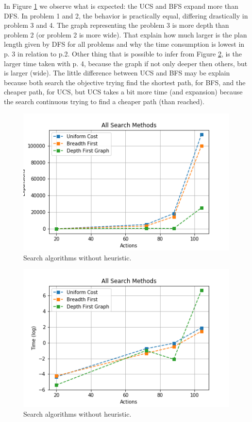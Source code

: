 \documentclass[a4paper]{article}
\begin{document}
In Figure \ref{figsm234} we observe what is expected: the UCS and BFS expand more than DFS. In problem 1 and 2, the behavior is practically equal, differing drastically in problem 3 and 4. The graph representing the problem 3 is more depth than problem 2 (or problem 2 is more wide). That explain how much larger is the plan length given by DFS for all problems and why the time consumption is lowest in p. 3 in relation to p.2. Other thing that is possible to infer from Figure \ref{figsm231}, is the larger time taken with p. 4, because the graph if not only deeper then others, but is larger (wide). The little difference between UCS and BFS may be explain because both search the objective trying find the shortest path, for BFS, and the cheaper path, for UCS, but UCS takes a bit more time (and expansion) because the search continuous trying to find a cheaper path (than reached).

\begin{figure}[htpb]
\begin{center}
\includegraphics[width=1\columnwidth]{fig/results_sm234.png}
\caption{Search algorithms without heuristic.}
\end{center}
\label{figsm234}
\end{figure}
    
\begin{figure}[htpb]
\begin{center}
\includegraphics[width=1\columnwidth]{fig/results_sm231.png}
\caption{Search algorithms without heuristic.}
\end{center}
\label{figsm231}
\end{figure}
\end{document}
